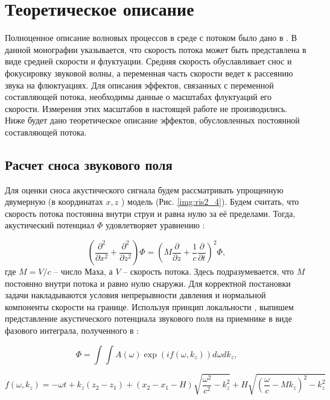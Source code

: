 \section{Теоретическое описание}
Полноценное описание волновых процессов в среде с потоком было дано в \cite{Blokhitsev1981}. В данной монографии указывается, что скорость потока может быть представлена в виде средней скорости и флуктуации. Средняя скорость обуславливает снос и фокусировку звуковой волны, а переменная часть скорости ведет к рассеянию звука на флюктуациях. Для описания эффектов, связанных с переменной составляющей потока, необходимы данные о масштабах флуктуаций его скорости. Измерения этих масштабов в настоящей работе не производились. Ниже будет дано теоретическое описание эффектов, обусловленных постоянной составляющей потока.

\subsection{Расчет сноса звукового поля}
Для оценки сноса акустического сигнала будем рассматривать упрощенную двумерную (в координатах $x, z$ ) модель (Рис. \ref{img:ris2_4}). Будем считать, что скорость потока постоянна внутри струи и равна нулю за её пределами. Тогда, акустический потенциал $\Phi$  удовлетворяет уравнению \cite{Blokhitsev1981}:

\begin{equation}
\label{eq:2_1}
\left(\frac{\partial^2}{\partial x^2} + \frac{\partial^2}{\partial z^2}\right) \Phi = \left(M \frac{\partial}{\partial z} + \frac{1}{c} \frac{\partial}{\partial t}\right)^2 \Phi,
\end{equation}
где $M = V/c$ – число Маха, а $V$ – скорость потока. Здесь подразумевается, что $M$ постоянно внутри потока и равно нулю снаружи. Для корректной постановки задачи накладываются условия непрерывности давления и нормальной компоненты скорости на границе.
Используя принцип локальности \cite{Keller1962}, выпишем представление акустического потенциала звукового поля на приемнике в виде фазового интеграла, полученного в \cite{Mironov1975}: 

\begin{equation}
\label{eq:2_2}
\Phi = \int \int A(\omega) \exp(i f (\omega, k_z)) d\omega dk_z,
\end{equation}

\begin{equation}
\label{eq:2_3}
f(\omega, k_z) = -\omega t + k_z(z_2 - z_1) + (x_2 - x_1 - H) \sqrt{\frac{\omega^2}{c^2} - k_z^2} + H\sqrt{\left(\frac{\omega}{c} - Mk_z\right)^2 - k_z^2}
\end{equation}

